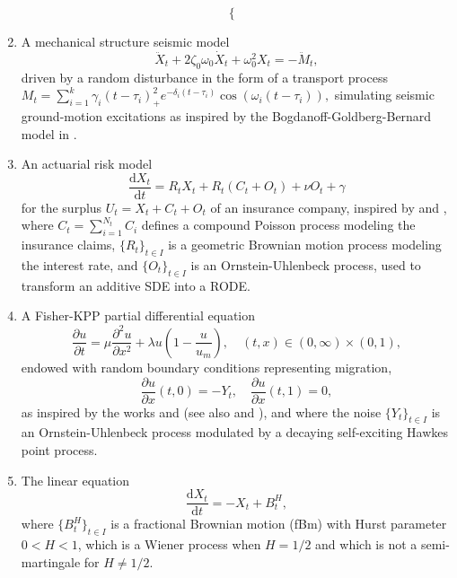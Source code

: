 \documentclass[reqno,12pt]{amsart}
\theoremstyle{plain} %
\theoremstyle{definition} %
\begin{document}
\begin{enumerate}
\begin{equation}
\begin{cases}
        \end{cases}
    \end{equation}
    \item \label{egearthquase} A mechanical structure seismic model 
    \begin{equation}
        \label{eqearthquake}
        \ddot X_t + 2\zeta_0\omega_0\dot X_t + \omega_0^2 X_t = - \ddot M_t,
    \end{equation}
    driven by a random disturbance in the form of a transport process $M_t = \sum_{i=1}^k \gamma_i (t - \tau_i)_+^2 e^{-\delta_i (t - \tau_i)}\cos(\omega_i (t - \tau_i)),$ simulating seismic ground-motion excitations as inspired by the Bogdanoff-Goldberg-Bernard model in \cite{BogdanoffGoldbergBernard1961}.
    \item An actuarial risk model
    \begin{equation}
        \label{eqrisk}
        \frac{\mathrm{d}X_t}{\mathrm{d}t} = R_t X_t + R_t (C_t + O_t) + \nu O_t + \gamma
    \end{equation}
    for the surplus $U_t = X_t + C_t + O_t$ of an insurance company, inspired by \cite{GerberShiu1998} and \cite{BrigoMercurio2006}, where $C_t = \sum_{i=1}^{N_t} C_i$ defines a compound Poisson process modeling the insurance claims, $\{R_t\}_{t\in I}$ is a geometric Brownian motion process modeling the interest rate, and $\{O_t\}_{t\in I}$ is an Ornstein-Uhlenbeck process, used to transform an additive SDE into a RODE.
    \item A Fisher-KPP partial differential equation
    \begin{equation}
        \label{eqfisherkpp}
        \frac{\partial u}{\displaystyle \partial t} = \mu\frac{\partial^2 u}{\partial x^2} + \lambda u\left(1 - \frac{u}{u_m}\right), \quad (t, x) \in (0, \infty) \times (0, 1),
    \end{equation}
    endowed with random boundary conditions representing migration,
    \begin{equation}
        \label{eqfisherkppbcs}
        \frac{\partial u}{\partial x}(t, 0) = - Y_t, \quad \frac{\partial u}{\partial x}(t, 1) = 0,
    \end{equation}  
    as inspired by the works \cite{SalakoShen2020} and \cite{FreidlinWentzell1992} (see also \cite{Fisher1937} and \cite{KPP1937}), and where the noise $\{Y_t\}_{t\in I}$ is an Ornstein-Uhlenbeck process modulated by a decaying self-exciting Hawkes point process.
    \item \label{eglinearfbm} The linear equation
    \begin{equation}
        \label{eqlinearfbm}
        \frac{\mathrm{d}X_t}{\mathrm{d} t} = -X_t + B^H_t,
    \end{equation}
    where $\{B^H_t\}_{t\in I}$ is a fractional Brownian motion (fBm) with Hurst parameter $0 < H < 1$, which is a Wiener process when $H=1/2$ and which is not a semi-martingale for $H\neq 1/2.$
\end{enumerate}
\end{document}

